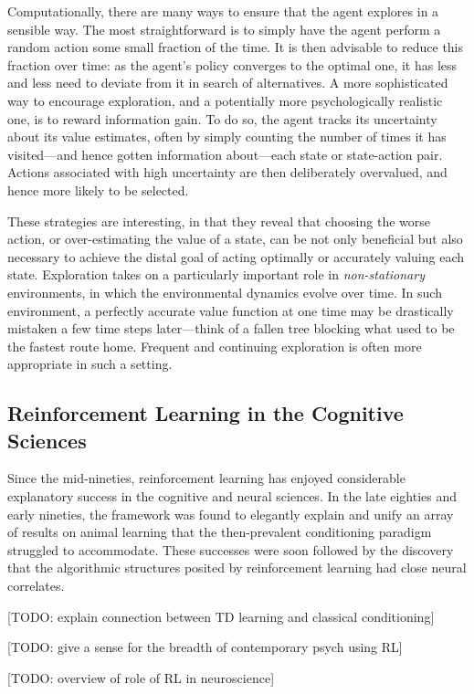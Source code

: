 Computationally, there are many ways to ensure that the agent explores in a sensible way.
The most straightforward is to simply have the agent perform a random action some small fraction of the time.
It is then advisable to reduce this fraction over time: as the agent's policy converges to the optimal one, it has less and less need to deviate from it in search of alternatives.
A more sophisticated way to encourage exploration, and a potentially more psychologically realistic one, is to reward information gain.
To do so, the agent tracks its uncertainty about its value estimates, often by simply counting the number of times it has visited---and hence gotten information about---each state or state-action pair.
Actions associated with high uncertainty are then deliberately overvalued, and hence more likely to be selected.

These strategies are interesting, in that they reveal that choosing the worse action, or over-estimating the value of a state, can be not only beneficial but also necessary to achieve the distal goal of acting optimally or accurately valuing each state.
Exploration takes on a particularly important role in \emph{non-stationary} environments, in which the environmental dynamics evolve over time.
In such environment, a perfectly accurate value function at one time may be drastically mistaken a few time steps later---think of a fallen tree blocking what used to be the fastest route home.
Frequent and continuing exploration is often more appropriate in such a setting.


\subsection{Reinforcement Learning in the Cognitive Sciences}

Since the mid-nineties, reinforcement learning has enjoyed considerable explanatory success in the cognitive and neural sciences.
In the late eighties and early nineties, the framework was found to elegantly explain and unify an array of results on animal learning that the then-prevalent conditioning paradigm struggled to accommodate.
These successes were soon followed by the discovery that the algorithmic structures posited by reinforcement learning had close neural correlates.

[TODO: explain connection between TD learning and classical conditioning]

[TODO: give a sense for the breadth of contemporary psych using RL]

[TODO: overview of role of RL in neuroscience]



